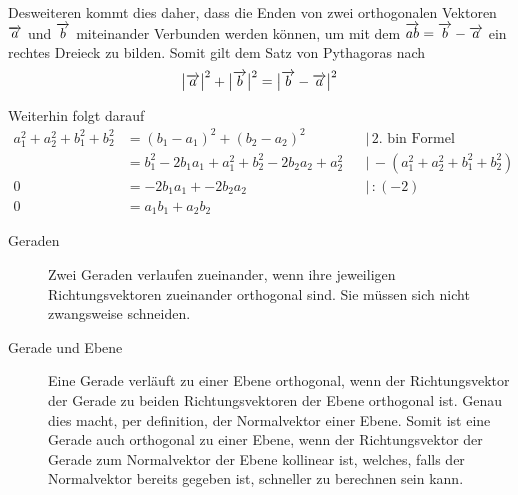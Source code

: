 \documentclass{article}
\begin{document}
\noindent \begin{minipage}{3.5cm}
\end{minipage}
\hfill
\begin{minipage}{\dimexpr\linewidth-3.5cm}
 Desweiteren kommt dies daher, dass die Enden von zwei orthogonalen Vektoren $\overrightarrow{a}$ und $\overrightarrow{b}$ miteinander Verbunden werden können, um mit dem $\overrightarrow{ab} = \overrightarrow{b} - \overrightarrow{a}$ ein rechtes Dreieck zu bilden. Somit gilt dem Satz von Pythagoras nach  
 \[  
  \big| {\overrightarrow{a}} \big|^2 + \big| {\overrightarrow{b}} \big|^2 = \big| {\overrightarrow{b} - \overrightarrow{a}} \big|^2
 \]
 
\end{minipage}
Weiterhin folgt darauf
\begin{align*}
 a_1^2+a_2^2+b_1^2+b_2^2 &= (b_1-a_1)^2 + (b_2-a_2)^2 && \vert\,\text{2. bin Formel} \\
   &= b_1^2-2b_1a_1+a_1^2 + b_2^2-2b_2a_2+a_2^2 && \vert\,-(a_1^2+a_2^2+b_1^2+b_2^2) \\
 0 &= -2b_1a_1 + -2b_2a_2 && \vert\, :(-2) \\
 0 &= a_1b_1+a_2b_2 
\end{align*}
 
\begin{description}
 \item[Geraden] Zwei Geraden verlaufen zueinander, wenn ihre jeweiligen Richtungsvektoren zueinander orthogonal sind. Sie müssen sich nicht zwangsweise schneiden.
 \item[Gerade und Ebene] Eine Gerade verläuft zu einer Ebene orthogonal, wenn der Richtungsvektor der Gerade zu beiden Richtungsvektoren der Ebene orthogonal ist. Genau dies macht, per definition, der Normalvektor einer Ebene. Somit ist eine Gerade auch orthogonal zu einer Ebene, wenn der Richtungsvektor der Gerade zum Normalvektor der Ebene kollinear ist, welches, falls der Normalvektor bereits gegeben ist, schneller zu berechnen sein kann. 
\end{description} 
\end{document}
